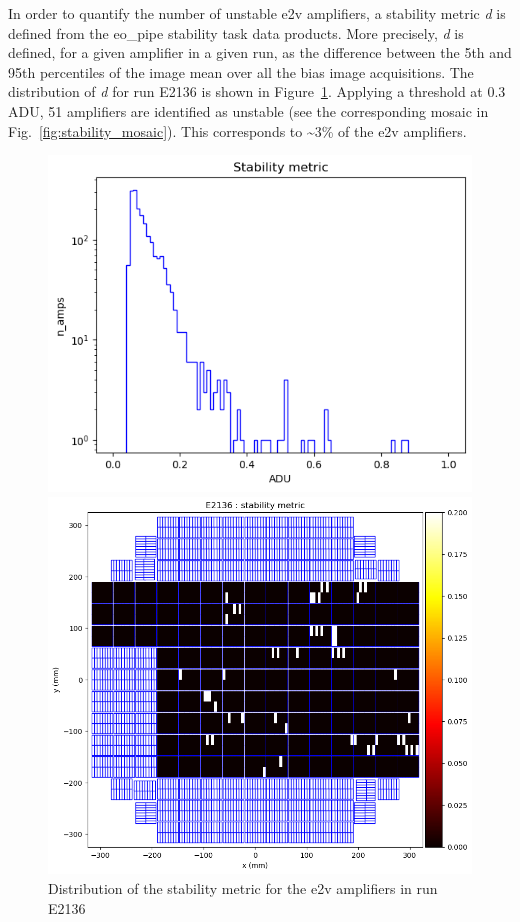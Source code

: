In order to quantify the number of unstable e2v amplifiers, a stability
metric \emph{d} is defined from the eo\_pipe
stability task data products. More precisely, \emph{d} is defined, for a
given amplifier in a given run, as the difference between the 5th and
95th percentiles of the image mean over all the bias image acquisitions. The
distribution of \emph{d} for run E2136 is shown in Figure~\ref{fig:stability_dist}. Applying a
threshold at 0.3\,ADU, 51 amplifiers are identified as unstable (see the
corresponding mosaic in Fig.~\ref{fig:stability_mosaic}). This corresponds to \textasciitilde3\% of the e2v
amplifiers.

\begin{figure}[htbp]
\centering
\begin{minipage}{0.45\textwidth}
    \centering
    \includegraphics[width=\textwidth]{sections/figures/E2136_distribution_d.png}
    \caption{Distribution of the stability metric for the e2v amplifiers in run E2136}
    \label{fig:stability_dist}
\end{minipage}
\hfill
\begin{minipage}{0.45\textwidth}
    \centering
    \includegraphics[width=\textwidth]{sections/figures/E2136_mosaic_d.png}

\end{minipage}
\end{figure}
